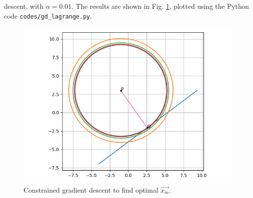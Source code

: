 \documentclass[journal,12pt,twocolumn]{IEEEtran}
\begin{document}
\begin{enumerate}
\begin{enumerate}
        descent, with $\alpha = 0.01$. The results are shown in Fig. 
        \ref{fig:gd-lag}, plotted using the Python code 
        \texttt{codes/gd\_lagrange.py}.
        \begin{figure}[!ht]
            \centering
            \includegraphics[width=\columnwidth]{figs/gd_lagrange.png}
            \caption{Constrained gradient descent to find optimal $\vec{x_m}$.}
            \label{fig:gd-lag}
        \end{figure}
    \end{enumerate}
\end{enumerate}
\end{document}
